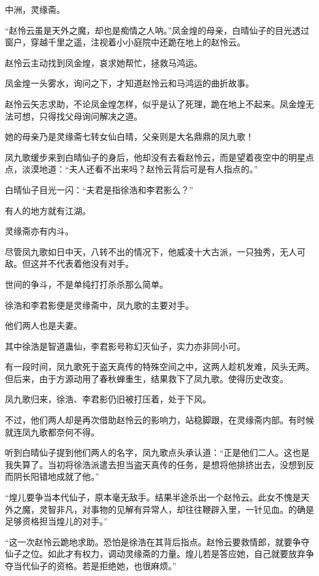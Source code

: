 
\begin{this_body}

中洲，灵缘斋。

“赵怜云虽是天外之魔，却也是痴情之人呐。”凤金煌的母亲，白晴仙子的目光透过窗户，穿越千里之遥，注视着小小庭院中还跪在地上的赵怜云。

赵怜云主动找到凤金煌，哀求她帮忙，拯救马鸿运。

凤金煌一头雾水，询问之下，才知道赵怜云和马鸿运的曲折故事。

赵怜云矢志求助，不论凤金煌怎样，似乎是认了死理，跪在地上不起来。凤金煌无法可想，只得找父母询问解决之道。

她的母亲乃是灵缘斋七转女仙白晴，父亲则是大名鼎鼎的凤九歌！

凤九歌缓步来到白晴仙子的身后，他却没有去看赵怜云，而是望着夜空中的明星点点，淡漠地道：“夫人还看不出来吗？赵怜云背后可是有人指点的。”

白晴仙子目光一闪：“夫君是指徐浩和李君影么？”

有人的地方就有江湖。

灵缘斋亦有内斗。

尽管凤九歌如日中天，八转不出的情况下，他威凌十大古派，一只独秀，无人可敌。但这并不代表着他没有对手。

世间的争斗，不是单纯打打杀杀那么简单。

徐浩和李君影便是灵缘斋中，凤九歌的主要对手。

他们两人也是夫妻。

其中徐浩是智道蛊仙，李君影号称幻灭仙子，实力亦非同小可。

有一段时间，凤九歌死于盗天真传的特殊空间之中，这两人趁机发难，风头无两。但后来，由于方源动用了春秋蝉重生，结果救下了凤九歌。使得历史改变。

凤九歌归来，徐浩、李君影仍旧被打压着，处于下风。

不过，他们两人却是再次借助赵怜云的影响力，站稳脚跟，在灵缘斋内部。有时候就连凤九歌都奈何不得。

听到白晴仙子提到他们两人的名字，凤九歌点头承认道：“正是他们二人。这也是我失算了。当初将徐浩派遣去担当盗天真传的任务，是想将他排挤出去，没想到反而阴长阳错地成就了他。”

“煌儿要争当本代仙子，原本毫无敌手。结果半途杀出一个赵怜云。此女不愧是天外之魔，灵智非凡，对事物的见解有异常人，却往往鞭辟入里，一针见血。的确是足够资格担当煌儿的对手。”

“这一次赵怜云跪地求助。恐怕是徐浩在其背后指点。赵怜云要救情郎，就要争夺仙子之位。如此才有权力，调动灵缘斋的力量。煌儿若是答应她，自己就要放弃争夺当代仙子的资格。若是拒绝她，也很麻烦。”


\end{this_body}
